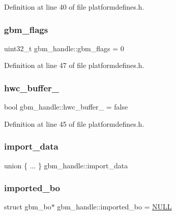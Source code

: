 Definition at line 40 of file platformdefines.\+h.

\mbox{\label{structgbm__handle_a5deee85dd01fe245644d1971dcdd1f89}} 
\subsubsection{\texorpdfstring{gbm\+\_\+flags}{gbm\_flags}}
{\footnotesize\ttfamily uint32\+\_\+t gbm\+\_\+handle\+::gbm\+\_\+flags = 0}



Definition at line 47 of file platformdefines.\+h.

\mbox{\label{structgbm__handle_aa98e98315d3cd7596b980b80e1199649}} 
\subsubsection{\texorpdfstring{hwc\+\_\+buffer\+\_\+}{hwc\_buffer\_}}
{\footnotesize\ttfamily bool gbm\+\_\+handle\+::hwc\+\_\+buffer\+\_\+ = false}



Definition at line 45 of file platformdefines.\+h.

\mbox{\label{structgbm__handle_ac2450148a271a449b35ff12966de8518}} 
\subsubsection{\texorpdfstring{import\+\_\+data}{import\_data}}
{\footnotesize\ttfamily union \{ ... \}   gbm\+\_\+handle\+::import\+\_\+data}

\mbox{\label{structgbm__handle_a4b2a575f5ac73f3979610fae70b44ffd}} 
\subsubsection{\texorpdfstring{imported\+\_\+bo}{imported\_bo}}
{\footnotesize\ttfamily struct gbm\+\_\+bo$\ast$ gbm\+\_\+handle\+::imported\+\_\+bo = \mbox{\hyperlink{alios_2platformdefines_8h_a070d2ce7b6bb7e5c05602aa8c308d0c4}{N\+U\+LL}}}



